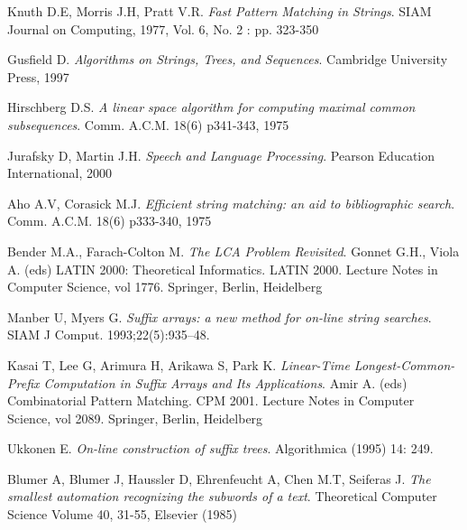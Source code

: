 
\begin{thebibliography}{99}

 Knuth D.E, Morris J.H, Pratt V.R. \textit{Fast Pattern Matching in Strings}. SIAM Journal on Computing, 1977, Vol. 6, No. 2 : pp. 323-350

 Gusfield D. \textit{Algorithms on Strings, Trees, and Sequences}. Cambridge University Press, 1997

 Hirschberg D.S. \textit{A linear space algorithm for computing maximal common subsequences}. Comm. A.C.M. 18(6) p341-343, 1975

 Jurafsky D, Martin J.H. \textit{Speech and Language Processing}. Pearson Education International, 2000

 Aho A.V, Corasick M.J. \textit{Efficient string matching: an aid to bibliographic search}. Comm. A.C.M. 18(6) p333-340, 1975

 Bender M.A., Farach-Colton M. \textit{The LCA Problem Revisited}. Gonnet G.H., Viola A. (eds) LATIN 2000: Theoretical Informatics. LATIN 2000. Lecture Notes in Computer Science, vol 1776. Springer, Berlin, Heidelberg

 Manber U, Myers G. \textit{Suffix arrays: a new method for on-line string searches}. SIAM J Comput. 1993;22(5):935--48.

 Kasai T, Lee G, Arimura H, Arikawa S, Park K. \textit{Linear-Time Longest-Common-Prefix Computation in Suffix Arrays and Its Applications}. Amir A. (eds) Combinatorial Pattern Matching. CPM 2001. Lecture Notes in Computer Science, vol 2089. Springer, Berlin, Heidelberg

 Ukkonen E. \textit{On-line construction of suffix trees}. Algorithmica (1995) 14: 249. 

 Blumer A, Blumer J, Haussler D, Ehrenfeucht A, Chen M.T, Seiferas J. \textit{The smallest automation recognizing the subwords of a text}. Theoretical Computer Science
Volume 40, 31-55, Elsevier (1985)


\end{thebibliography}
